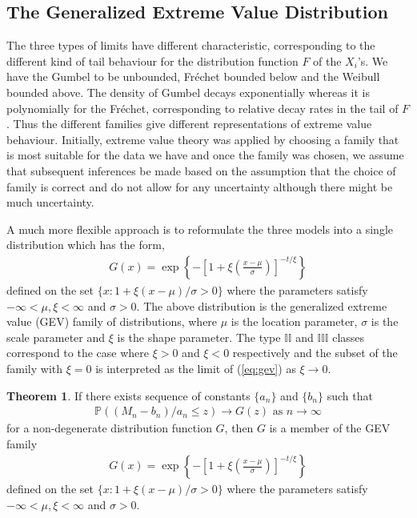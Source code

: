 \documentclass[a4paper,10pt]{article}
\theoremstyle{definition}
\newtheorem{thm}{Theorem}[section]
\numberwithin{equation}{section}
\begin{document}
\subsection{The Generalized Extreme Value Distribution}
The three types of limits have different characteristic, corresponding to the different kind of tail behaviour for the distribution function $F$ of the $X_i$'s. We have the Gumbel to be unbounded, Fr\'echet bounded below and the Weibull bounded above. The density of Gumbel decays exponentially whereas it is polynomially for the Fr\'echet, corresponding to relative decay rates in the tail of $F$. Thus the different families give different representations of extreme value behaviour. Initially, extreme value theory was applied by choosing a family that is most suitable for the data we have and once the family was chosen, we assume that subsequent inferences be made based on the assumption that the choice of family is correct and do not allow for any uncertainty although there might be much uncertainty.

A much more flexible approach is to reformulate the three models into a single distribution which has the form,
\begin{align}\label{eq:gev}
G(x) = \exp \left\{-\left[1+\xi\left(\frac{x-\mu}{\sigma}\right)\right]^{-t/\xi}\right\}
\end{align}
defined on the set $\{x : 1 + \xi(x-\mu)/\sigma>0\}$ where the parameters satisfy $-\infty<\mu, \xi<\infty$ and $\sigma >0$. The above distribution is the generalized extreme value (GEV) family of distributions, where $\mu$ is the location parameter, $\sigma$ is the scale parameter and $\xi$ is the shape parameter. The type $\mathbb{II}$ and $\mathbb{III}$ classes correspond to the case where $\xi >0$ and $\xi<0$ respectively and the subset of the family with $\xi = 0$ is interpreted as the limit of (\ref{eq:gev}) as $\xi \to 0$.

\begin{thm}\label{thm:gev}
If there exists sequence of constants $\{a_n\}$ and $\{b_n\}$ such that 
\begin{align}\label{eq:gevlimit}
\mathbb{P}((M_n - b_n)/a_n\leq z) \to G(z) \text{ as } n \to \infty
\end{align}
for a non-degenerate distribution function $G$, then $G$ is a member of the GEV family
\begin{align}
G(x) = \exp \left\{-\left[1+\xi\left(\frac{x-\mu}{\sigma}\right)\right]^{-t/\xi}\right\}
\end{align}
defined on the set $\{x : 1 + \xi(x-\mu)/\sigma>0\}$ where the parameters satisfy $-\infty<\mu, \xi<\infty$ and $\sigma >0$.
\end{thm}
\end{document}
